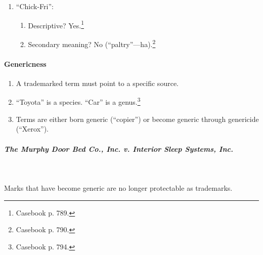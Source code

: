 \begin{enumerate}
\begin{enumerate}
\begin{enumerate}
            descriptive sense of ``fish fry.'' So, its competitors are free to 
            use them in that sense.\footnote{Casebook p. 789.}
            \item Also, dissimilar trade dress would likely prevent consumer 
            confusion.
        \end{enumerate}
    \end{enumerate}
    \item ``Chick-Fri'':
    \begin{enumerate}
        \item Descriptive? Yes.\footnote{Casebook p. 789.}
        \item Secondary meaning? No (``paltry''---ha).\footnote{Casebook p. 
        790.}
    \end{enumerate}
\end{enumerate}

\paragraph{Genericness}

\begin{enumerate}
    \item A trademarked term must point to a specific source. 
    \item ``Toyota'' is a species. ``Car'' is a genus.\footnote{Casebook p. 
    794.}
    \item Terms are either born generic (``copier'') or become generic through 
    genericide (``Xerox'').
\end{enumerate}

\paragraph{\emph{The Murphy Door Bed Co., Inc. v. Interior Sleep Systems, Inc.}}
~\\\\
Marks that have become generic are no longer protectable as trademarks.


